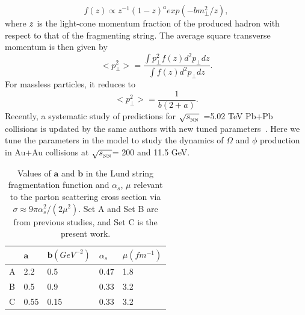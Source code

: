 \documentclass[twocolumn,aps,prc,showpacs,superscriptaddress,preprintnumbers,floatfix,nofootinbib]{revtex4}
\newcommand{ \srt  }{$\sqrt{s_{_{\rm NN}}}$}
\begin{document}
\begin{CJK*}{GBK}{song}
    \begin{equation}
        f(z)\propto z^{-1}(1-z)^{a}exp(-bm_{\perp }^{2}/z),
        \label{dn_Lund}
    \end{equation}
where $\it z$ is the light-cone momentum fraction of the produced hadron with respect to that of the fragmenting string. The average square transverse momentum is then given by~\cite{AMPT-model}
     \begin{equation}
        <p_{\perp }^{2}>=\frac{\int p_{\perp }^{2}f(z)d^{2}p_{\perp }dz}{\int f(z)d^{2}p_{\perp }dz}.
        \label{dn_Lund1}
    \end{equation}
For massless particles, it reduces to~\cite{AMPT-model}
     \begin{equation}
        <p_{\perp }^{2}>=\frac{1}{b(2+a)}.
        \label{dn_Lund2}
    \end{equation}
Recently, a systematic study of predictions for \srt~=5.02 TeV Pb+Pb collisions is updated by the same authors with new tuned parameters~\cite{ablin2}. Here we tune the parameters in the model to study the dynamics of $\Omega$ and $\phi$ production in Au+Au collisions at \srt = 200 and 11.5 GeV.


    \begin{table}[htbp]
       \caption{Values of $\bm a$ and $\bm b$ in the Lund string fragmentation function and $\alpha _{s}$, $\mu$ relevant to the parton scattering cross section via $\sigma\approx 9\pi\alpha _{s}^{2}/\left ( 2\mu^{2} \right )$. Set A \cite{AMPT-model} and Set B \cite{ab} are from previous studies, and Set C is the present work.}
       \label{para}
       \centering
       \begin{tabular}{p{45pt} p{45pt} p{45pt} p{45pt} p{45pt}}
          \hline
          \hline
             & $\bm a$ & $\bm b(GeV^{-2})$& $\alpha _{s}$ & $\mu(fm^{-1})$  \\
          \hline
          A  & 2.2 & 0.5 & 0.47 &   1.8   \\
          B & 0.5 & 0.9 & 0.33 & 3.2 \\
          C  & 0.55 & 0.15  & 0.33 & 3.2    \\
          \hline
          \hline
       \end{tabular}
       \end{table}


\end{CJK*}
\end{document}
